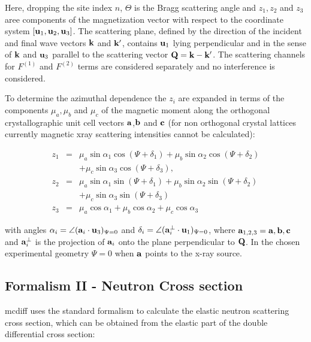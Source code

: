 Here, dropping the site index $n$, $\Theta$ is the Bragg scattering angle and
$z_1, z_2$ and $z_3$ aree components of the magnetization vector with respect
to the coordinate system $[\mathbf u_1,\mathbf u_2,\mathbf u_3]$. The scattering plane, defined by the
direction of the incident and final wave vectors  $\mathbf k$ and $\mathbf k'$, contains $\mathbf u_1$ lying
perpendicular and in the sense of $\mathbf k$ and $\mathbf u_3$ parallel to the scattering
vector $\mathbf Q=\mathbf k-\mathbf k'$. The scattering channels for $F^{(1)}$ and $F^(2)$ terms are considered
separately and no interference is considered. 

To determine the azimuthal dependence the $z_i$ are expanded in terms of the components
$\mu_a,\mu_b$ and $\mu_c$ of the magnetic moment along the orthogonal crystallographic
unit cell vectors $\mathbf a$,$\mathbf b$ and $\mathbf c$ (for non orthogonal
crystal lattices currently magnetic xray scattering intensities cannot
be calculated):

\begin{eqnarray}
z_1&=&\mu_a \sin \alpha_1 \cos(\Psi+\delta_1)+\mu_b \sin \alpha_2 \cos(\Psi +\delta_2) \nonumber \\
&& +\mu_c \sin \alpha_3 \cos (\Psi +\delta_3), \nonumber \\
z_2 & = & \mu_a \sin \alpha_1 \sin (\Psi +\delta_1)+\mu_b \sin \alpha_2 \sin (\Psi+\delta_2) \nonumber \\
& & +\mu_c \sin \alpha_3 \sin (\Psi +\delta_3) \nonumber \\
z_3 & = & \mu_a \cos \alpha_1 + \mu_b \cos \alpha_2 + \mu_c \cos \alpha_3 
\end{eqnarray}
 
with angles $\alpha_i=\angle(\mathbf a_i \cdot \mathbf u_3)_{\Psi=0}$ and $\delta_i=\angle(\mbf a_i^{\perp}\cdot %
\mbf u_1)_{\Psi=0}$, where $\mathbf a_{1,2,3}=\mathbf a,\mathbf b,\mathbf c$ and $\mathbf a_i^{\perp}$ is the projection of
$\mathbf a_i$ onto the plane perpendicular to $\mathbf Q$. In the chosen experimental geometry
$\Psi=0$ when $\mathbf a$ points to the x-ray source.


\subsection{Formalism II - Neutron Cross section}

{\prg mcdiff} uses the standard formalism to calculate the elastic neutron scattering
cross section, which can be obtained from the elastic part of the double differential
cross section:

